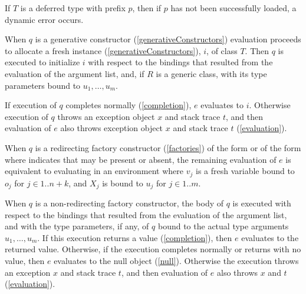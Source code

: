 \documentclass[makeidx]{article}
\begin{document}
\LMHash{}%
If $T$ is a deferred type with prefix $p$, then if $p$ has not been successfully loaded, a dynamic error occurs.

\LMHash{}%
When $q$ is a generative constructor
(\ref{generativeConstructors})
evaluation proceeds to allocate a fresh instance
(\ref{generativeConstructors}), $i$, of class $T$.
Then $q$ is executed to initialize $i$ with respect to
the bindings that resulted from the evaluation of the argument list, and,
if $R$ is a generic class,
with its type parameters bound to $u_1, \ldots, u_m$.

\LMHash{}%
If execution of $q$ completes normally (\ref{completion}), $e$ evaluates to $i$.
Otherwise execution of $q$ throws an exception object $x$ and stack trace $t$,
and then evaluation of $e$ also throws exception object $x$ and stack trace $t$
(\ref{evaluation}).

\LMHash{}%
When $q$ is a redirecting factory constructor
(\ref{factories})
of the form  or
of the form 
where  indicates that \CONST{} may be present or absent,
the remaining evaluation of $e$ is equivalent to
evaluating
in an environment where
$v_j$ is a fresh variable bound to $o_j$ for $j \in 1 .. n + k$, and
$X_j$ is bound to $u_j$ for $j \in 1 .. m$.

\LMHash{}%
When $q$ is a non-redirecting factory constructor,
the body of $q$ is executed with respect to
the bindings that resulted from the evaluation of the argument list,
and with the type parameters, if any, of $q$ bound to
the actual type arguments $u_1, \ldots, u_m$.
If this execution returns a value (\ref{completion}),
then $e$ evaluates to the returned value.
Otherwise, if the execution completes normally or returns with no value,
then $e$ evaluates to the null object (\ref{null}).
Otherwise the execution throws an exception $x$ and stack trace $t$,
and then evaluation of $e$ also throws $x$ and $t$ (\ref{evaluation}).
\end{document}
